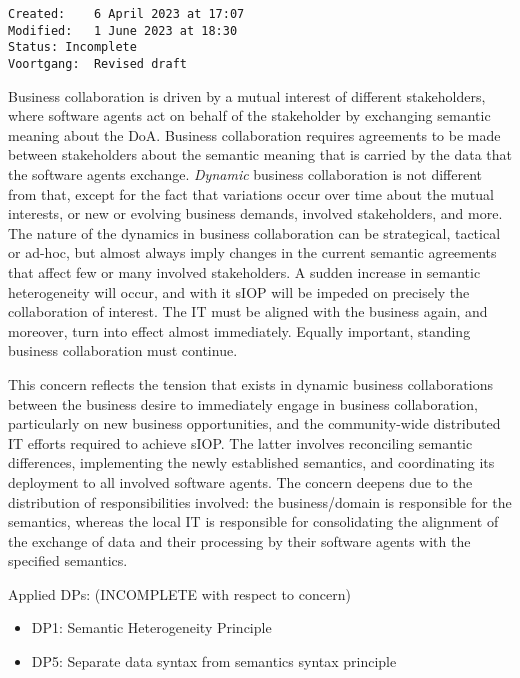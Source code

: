 \documentclass[sort&compress,preprint,3p,authoryear,twocolumn]{elsarticle}
\providecommand{\tightlist}{%
  \setlength{\itemsep}{0pt}\setlength{\parskip}{0pt}}
\theoremstyle{break}			%
\begin{document}
\begin{verbatim}
Created:    6 April 2023 at 17:07
Modified:   1 June 2023 at 18:30
Status: Incomplete
Voortgang:  Revised draft
\end{verbatim}

Business collaboration is driven by a mutual interest of different
stakeholders, where software agents act on behalf of the stakeholder by
exchanging semantic meaning about the DoA. Business collaboration
requires agreements to be made between stakeholders about the semantic
meaning that is carried by the data that the software agents exchange.
\emph{Dynamic} business collaboration is not different from that, except
for the fact that variations occur over time about the mutual interests,
or new or evolving business demands, involved stakeholders, and more.
The nature of the dynamics in business collaboration can be strategical,
tactical or ad-hoc, but almost always imply changes in the current
semantic agreements that affect few or many involved stakeholders. A
sudden increase in semantic heterogeneity will occur, and with it sIOP
will be impeded on precisely the collaboration of interest. The IT must
be aligned with the business again, and moreover, turn into effect
almost immediately. Equally important, standing business collaboration
must continue.

\begin{mmconcern}\label{cncrn:dynamic-collaboration}
This concern reflects the tension that exists in dynamic business collaborations between the business desire to immediately engage in business collaboration, particularly on new business opportunities, and the community-wide distributed IT efforts required to achieve sIOP. The latter involves reconciling semantic differences, implementing the newly established semantics, and coordinating its deployment to all involved software agents. The concern deepens due to the distribution of responsibilities involved: the business/domain is responsible for the semantics, whereas the local IT is responsible for consolidating the alignment of the exchange of data and their processing by their software agents with the specified semantics.
\end{mmconcern}

Applied DPs: (INCOMPLETE with respect to concern)

\begin{itemize}
\tightlist
\item
  DP1: Semantic Heterogeneity Principle
\item
  DP5: Separate data syntax from semantics syntax principle
\end{itemize}
\end{document}
